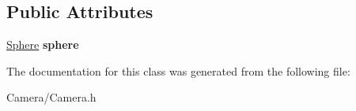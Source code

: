 \subsection*{Public Attributes}
\begin{DoxyCompactItemize}
\item 
\mbox{\label{class_f_p_s_camera_ae33a5225fc7cab505ba74bb4d0df4b99}} 
\hyperlink{class_sphere}{Sphere} {\bfseries sphere}
\end{DoxyCompactItemize}


The documentation for this class was generated from the following file\+:\begin{DoxyCompactItemize}
\item 
Camera/Camera.\+h\end{DoxyCompactItemize}
